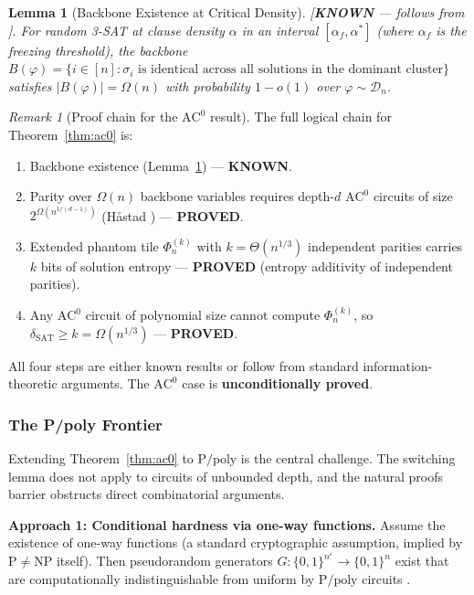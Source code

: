 \documentclass[11pt]{article}
\newtheorem{lemma}[theorem]{Lemma}
\theoremstyle{definition}
\theoremstyle{remark}
\newtheorem{remark}[theorem]{Remark}
\newcommand{\calD}{\mathcal{D}}
\newcommand{\Ppoly}{\mathrm{P/poly}}
\newcommand{\ACz}{\mathrm{AC}^0}
\newcommand{\dSAT}{\delta_{\mathrm{SAT}}}
\begin{document}
\begin{lemma}[Backbone Existence at Critical Density]
\label{lem:backbone}
\textup{[\textbf{KNOWN} --- follows from \cite{ART, MPZ}].}
For random 3-SAT at clause density $\alpha$ in an interval
$[\alpha_f, \alpha^*]$ (where $\alpha_f$ is the freezing threshold),
the backbone $B(\varphi) = \{i \in [n] : \sigma_i \text{ is identical
across all solutions in the dominant cluster}\}$ satisfies
$|B(\varphi)| = \Omega(n)$ with probability $1 - o(1)$ over $\varphi
\sim \calD_n$.
\end{lemma}

\begin{remark}[Proof chain for the $\ACz$ result]
The full logical chain for Theorem~\ref{thm:ac0} is:
\begin{enumerate}[nosep]
  \item Backbone existence (Lemma~\ref{lem:backbone}) --- \textbf{KNOWN}.
  \item Parity over $\Omega(n)$ backbone variables requires depth-$d$
    $\ACz$ circuits of size $2^{\Omega(n^{1/(d-1)})}$ (H\aa stad
    \cite{Hastad}) --- \textbf{PROVED}.
  \item Extended phantom tile $\Phi_n^{(k)}$ with $k = \Theta(n^{1/3})$
    independent parities carries $k$ bits of solution entropy ---
    \textbf{PROVED} (entropy additivity of independent parities).
  \item Any $\ACz$ circuit of polynomial size cannot compute $\Phi_n^{(k)}$,
    so $\dSAT \geq k = \Omega(n^{1/3})$ --- \textbf{PROVED}.
\end{enumerate}
All four steps are either known results or follow from standard
information-theoretic arguments.  The $\ACz$ case is \textbf{unconditionally
proved}.
\end{remark}

\subsubsection{The P/poly Frontier}

\noindent{}

\medskip

Extending Theorem~\ref{thm:ac0} to $\Ppoly$ is the central challenge.
The switching lemma does not apply to circuits of unbounded depth, and
the natural proofs barrier \cite{RR} obstructs direct combinatorial arguments.

\textbf{Approach 1: Conditional hardness via one-way functions.}
Assume the existence of one-way functions (a standard cryptographic
assumption, implied by $\mathrm{P} \neq \mathrm{NP}$ itself).  Then
pseudorandom generators $G: \{0,1\}^{n^\varepsilon} \to \{0,1\}^n$ exist
that are computationally indistinguishable from uniform by $\Ppoly$
circuits \cite{HILL}.
\end{document}
